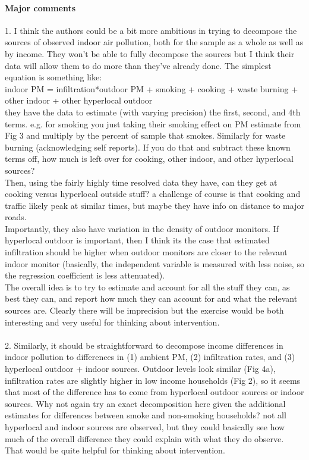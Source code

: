 \documentclass[12pt,english]{article}
\begin{document}
\paragraph{Major comments}
1. I think the authors could be a bit more ambitious in trying to decompose the sources of observed indoor air pollution, both for the sample as a whole as well as by income. They won't be able to fully decompose the sources but I think their data will allow them to do more than they've already done. The simplest equation is something like:
\\
indoor PM = infiltration*outdoor PM + smoking + cooking + waste burning + other indoor + other hyperlocal outdoor
\\
they have the data to estimate (with varying precision) the first, second, and 4th terms. e.g. for smoking you just taking their smoking effect on PM estimate from Fig 3 and multiply by the percent of sample that smokes. Similarly for waste burning (acknowledging self reports). If you do that and subtract these known terms off, how much is left over for cooking, other indoor, and other hyperlocal sources?
\\
Then, using the fairly highly time resolved data they have, can they get at cooking versus hyperlocal outside stuff? a challenge of course is that cooking and traffic likely peak at similar times, but maybe they have info on distance to major roads.
\\
Importantly, they also have variation in the density of outdoor monitors. If hyperlocal outdoor is important, then I think its the case that estimated infiltration should be higher when outdoor monitors are closer to the relevant indoor monitor (basically, the independent variable is measured with less noise, so the regression coefficient is less attenuated).
\\
The overall idea is to try to estimate and account for all the stuff they can, as best they can, and report how much they can account for and what the relevant sources are. Clearly there will be imprecision but the exercise would be both interesting and very useful for thinking about intervention.
\\
\\
2. Similarly, it should be straightforward to decompose income differences in indoor pollution to differences in (1) ambient PM, (2) infiltration rates, and (3) hyperlocal outdoor + indoor sources. Outdoor levels look similar (Fig 4a), infiltration rates are slightly higher in low income households (Fig 2), so it seems that most of the difference has to come from hyperlocal outdoor sources or indoor sources. Why not again try an exact decomposition here given the additional estimates for differences between smoke and non-smoking households? not all hyperlocal and indoor sources are observed, but they could basically see how much of the overall difference they could explain with what they do observe. That would be quite helpful for thinking about intervention.
\end{document}
